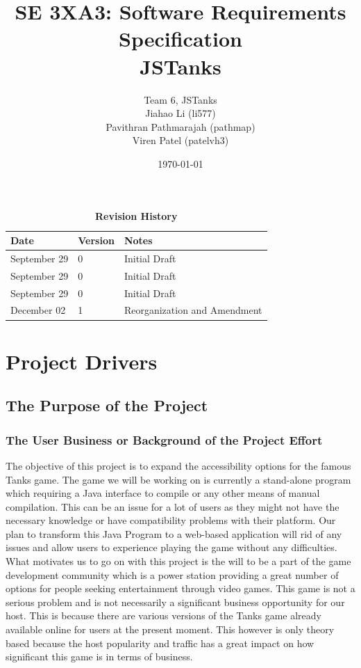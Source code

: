 \documentclass[12pt, titlepage]{article}
\title{SE 3XA3: Software Requirements Specification\\JSTanks}
\author{Team 6, JSTanks
		\\ Jiahao Li (li577)
		\\ Pavithran Pathmarajah (pathmap)
		\\ Viren Patel (patelvh3)
}
\date{\today}
\begin{document}
\maketitle
{}
\tableofcontents
\listoftables
\listoffigures

\begin{table}[bp]
\caption{\bf Revision History}
\begin{tabularx}{\textwidth}{p{3cm}p{2cm}X}
\toprule {\bf Date} & {\bf Version} & {\bf Notes}\\
\midrule
September 29 & 0 & Initial Draft\\
September 29 & 0 & Initial Draft\\
September 29 & 0 & Initial Draft\\
December 02 & 1 & Reorganization and Amendment\\
\bottomrule
\end{tabularx}
\end{table}

\newpage


\section{Project Drivers}
\subsection{The Purpose of the Project}
\subsubsection{The User Business or Background of the Project Effort}
The objective of this project is to expand the accessibility options for the famous
Tanks game. The game we will be working on is currently a stand-alone program
which requiring a Java interface to compile or any other means of manual
compilation. This can be an issue for a lot of users as they might not have the
necessary knowledge or have compatibility problems with their platform. Our plan
to transform this Java Program to a web-based application will rid of any issues
and allow users to experience playing the game without any difficulties. What
motivates us to go on with this project is the will to be a part of the game
development community which is a power station providing a great number of
options for people seeking entertainment through video games. This game is not a
serious problem and is not necessarily a significant business opportunity for
our host. This is because there are various versions of the Tanks game already
available online for users at the present moment. This however is only theory
based because the host popularity and traffic has a great impact on how
significant this game is in terms of business.
\end{document}
